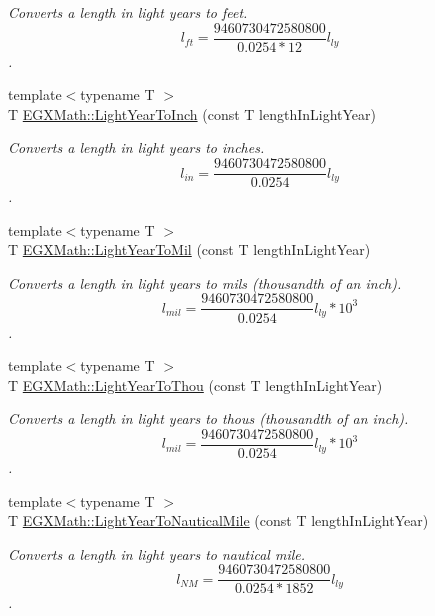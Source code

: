 \begin{DoxyCompactItemize}
\begin{DoxyCompactList}\small\item\em Converts a length in light years to feet. \[ l_{ft}= \frac{9460730472580800}{0.0254 * 12} l_{ly} \]. \end{DoxyCompactList}\item 
{\footnotesize template$<$typename T $>$ }\\T \mbox{\hyperlink{group___e_g_x_math-_conversions-_length_conversions-_astronomical-_light_year-_imperial_gafb89ce302210990623906b463d6e50cb}{E\+G\+X\+Math\+::\+Light\+Year\+To\+Inch}} (const T length\+In\+Light\+Year)
\begin{DoxyCompactList}\small\item\em Converts a length in light years to inches. \[ l_{in}= \frac{9460730472580800}{0.0254} l_{ly} \]. \end{DoxyCompactList}\item 
{\footnotesize template$<$typename T $>$ }\\T \mbox{\hyperlink{group___e_g_x_math-_conversions-_length_conversions-_astronomical-_light_year-_imperial_ga980a3d37f73ebc5f217366ee01e7b4ae}{E\+G\+X\+Math\+::\+Light\+Year\+To\+Mil}} (const T length\+In\+Light\+Year)
\begin{DoxyCompactList}\small\item\em Converts a length in light years to mils (thousandth of an inch). \[ l_{mil}= \frac{9460730472580800}{0.0254} l_{ly} * 10^{3} \]. \end{DoxyCompactList}\item 
{\footnotesize template$<$typename T $>$ }\\T \mbox{\hyperlink{group___e_g_x_math-_conversions-_length_conversions-_astronomical-_light_year-_imperial_ga84d83b078dfeb11c1cdaca84b4f988cb}{E\+G\+X\+Math\+::\+Light\+Year\+To\+Thou}} (const T length\+In\+Light\+Year)
\begin{DoxyCompactList}\small\item\em Converts a length in light years to thous (thousandth of an inch). \[ l_{mil}= \frac{9460730472580800}{0.0254} l_{ly} * 10^{3} \]. \end{DoxyCompactList}\item 
{\footnotesize template$<$typename T $>$ }\\T \mbox{\hyperlink{group___e_g_x_math-_conversions-_length_conversions-_astronomical-_light_year-_nautical_ga0195b6c7d9efe06bed6d571046d485b4}{E\+G\+X\+Math\+::\+Light\+Year\+To\+Nautical\+Mile}} (const T length\+In\+Light\+Year)
\begin{DoxyCompactList}\small\item\em Converts a length in light years to nautical mile. \[ l_{NM}= \frac{9460730472580800}{0.0254 * 1852} l_{ly} \]. \end{DoxyCompactList}\item 

\end{DoxyCompactItemize}
